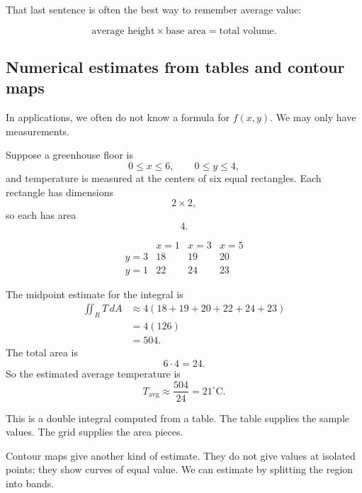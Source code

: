 That last sentence is often the best way to remember average value:

\[
\boxed{
    \text{average height}\times\text{base area}
    =
    \text{total volume}.
}
\]

\subsection{Numerical estimates from tables and contour maps}

In applications, we often do not know a formula for \(f(x,y)\).  We may only have
measurements.

Suppose a greenhouse floor is
\[
    0\le x\le 6,\qquad 0\le y\le 4,
\]
and temperature is measured at the centers of six equal rectangles.  Each rectangle has
dimensions
\[
    2\times2,
\]
so each has area
\[
    4.
\]

\[
\begin{array}{c|ccc}
 & x=1 & x=3 & x=5 \\ \hline
y=3 & 18 & 19 & 20\\
y=1 & 22 & 24 & 23
\end{array}
\]

The midpoint estimate for the integral is
\[
\begin{aligned}
\iint_R T\,dA
&\approx
4(18+19+20+22+24+23)\\
&=
4(126)\\
&=
504.
\end{aligned}
\]
The total area is
\[
    6\cdot4=24.
\]
So the estimated average temperature is
\[
    T_{\text{avg}}
    \approx
    \frac{504}{24}
    =
    21^\circ\text{C}.
\]

This is a double integral computed from a table.  The table supplies the sample values.
The grid supplies the area pieces.

Contour maps give another kind of estimate.  They do not give values at isolated
points; they show curves of equal value.  We can estimate by splitting the region into
bands.

